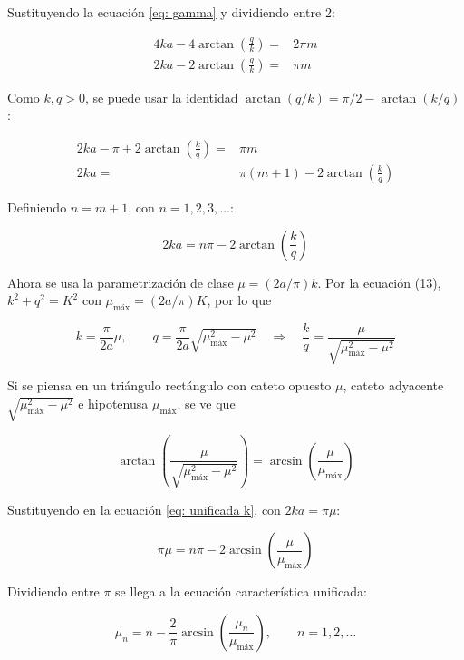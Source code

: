 Sustituyendo la ecuación \ref{eq: gamma} y dividiendo entre 2:

\begin{align}
    4ka - 4\arctan\left(\frac{q}{k}\right) =& 2\pi m \\
    2ka - 2\arctan\left(\frac{q}{k}\right) =& \pi m
\end{align}

Como $k,q>0$, se puede usar la identidad $\arctan(q/k)=\pi/2-\arctan(k/q)$:

\begin{align}
    2ka - \pi + 2\arctan\left(\frac{k}{q}\right) =& \pi m \\
    2ka =& \pi(m+1) - 2\arctan\left(\frac{k}{q}\right)
\end{align}

Definiendo $n=m+1$, con $n=1,2,3,\ldots$:

\begin{equation}
    2ka = n\pi - 2\arctan\left(\frac{k}{q}\right)
    \label{eq: unificada k}
\end{equation}

Ahora se usa la parametrización de clase $\mu=(2a/\pi)k$. Por la ecuación (13), $k^2+q^2=K^2$ con $\mu_{\text{máx}}=(2a/\pi)K$, por lo que

\begin{equation*}
    k=\frac{\pi}{2a}\mu, \qquad q=\frac{\pi}{2a}\sqrt{\mu_{\text{máx}}^2-\mu^2} \quad\Rightarrow\quad \frac{k}{q}=\frac{\mu}{\sqrt{\mu_{\text{máx}}^2-\mu^2}}
\end{equation*}

Si se piensa en un triángulo rectángulo con cateto opuesto $\mu$, cateto adyacente $\sqrt{\mu_{\text{máx}}^2-\mu^2}$ e hipotenusa $\mu_{\text{máx}}$, se ve que

\begin{equation*}
    \arctan\left(\frac{\mu}{\sqrt{\mu_{\text{máx}}^2-\mu^2}}\right) = \arcsin\left(\frac{\mu}{\mu_{\text{máx}}}\right)
\end{equation*}

Sustituyendo en la ecuación \ref{eq: unificada k}, con $2ka=\pi\mu$:

\begin{equation}
    \pi\mu = n\pi - 2\arcsin\left(\frac{\mu}{\mu_{\text{máx}}}\right)
\end{equation}

Dividiendo entre $\pi$ se llega a la ecuación característica unificada:

\begin{equation}
    \boxed{\mu_n = n - \frac{2}{\pi}\arcsin\left(\frac{\mu_n}{\mu_{\text{máx}}}\right), \qquad n=1,2,\ldots}
    \label{eq: ec unificada}
\end{equation}

